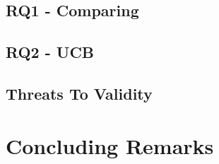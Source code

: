 \documentclass[sigconf]{acmart}
\begin{document}
\subsection{RQ1 - Comparing}

\subsection{RQ2 - UCB}

\subsection{Threats To Validity}
\label{sec:results:threats}

\section{Concluding Remarks}
\label{sec:conclusion}

\balance

 
\end{document}
